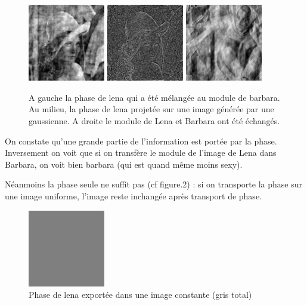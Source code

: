 \documentclass{article}
\begin{document}
\begin{figure}[h]
	\includegraphics[width=0.3\textwidth]{phase_swapping.jpg}
	\includegraphics[width=0.3\textwidth]{phase_swapping_in_random.jpg}
	\includegraphics[width=0.3\textwidth]{module_swapping.jpg}

  \caption{A gauche la phase de lena qui a été mélangée au module de barbara. Au milieu, la phase de lena projetée sur une image générée par une gaussienne. A droite le module de Lena et Barbara ont été échangés.}
\end{figure}

On constate qu'une grande partie de l'information est portée par la phase. Inversement on voit que si on transfère le module de l'image de Lena dans Barbara, on voit bien barbara (qui est quand même moins sexy). 

Néanmoins la phase seule ne suffit pas (cf figure.2) : si on transporte la phase sur une image uniforme, l'image reste inchangée après transport de phase. 

\begin{figure}[h]

	\includegraphics[width=0.3\textwidth]{phase_swapping_in_grey_image.jpg}

  \caption{Phase de lena exportée dans une image constante (gris total)}
\end{figure}
\end{document}
